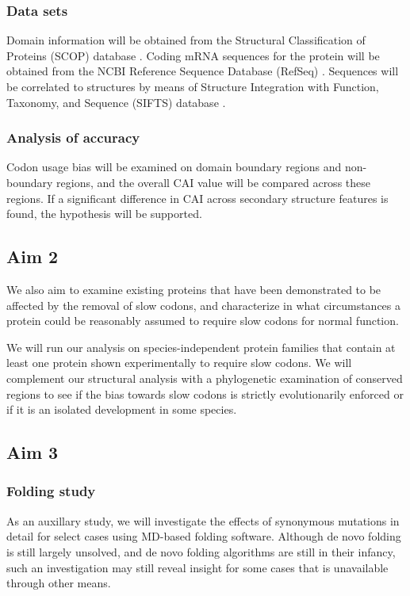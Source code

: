 \documentclass[11pt]{nih}
\begin{document}
\subsubsection{Data sets}
Domain information will be obtained from the Structural Classification of Proteins (SCOP) database \citep{scop}. Coding mRNA sequences for the protein will be obtained from the NCBI Reference Sequence Database (RefSeq) \citep{refseq}. Sequences will be correlated to structures by means of Structure Integration with Function, Taxonomy, and Sequence (SIFTS) database \citep{sifts}.

\subsubsection{Analysis of accuracy}
Codon usage bias will be examined on domain boundary regions and non-boundary regions, and the overall CAI value will be compared across these regions. If a significant difference in CAI across secondary structure features is found, the hypothesis will be supported.
\cite{Liu:2011p8245}


\subsection{Aim 2}
We also aim to examine existing proteins that have been demonstrated to be affected by the removal of slow codons, and characterize in what circumstances a protein could be reasonably assumed to require slow codons for normal function.

We will run our analysis on species-independent protein families that contain at least one protein shown experimentally to require slow codons. We will complement our structural analysis with a phylogenetic examination of conserved regions to see if the bias towards slow codons is strictly evolutionarily enforced or if it is an isolated development in some species.
\subsection{Aim 3}

\subsubsection{Folding study}
As an auxillary study, we will investigate the effects of synonymous mutations in detail for select cases using MD-based folding software. Although de novo folding is still largely unsolved, and de novo folding algorithms are still in their infancy, such an investigation may still reveal insight for some cases that is unavailable through other means. \cite{Zhang:2008p3335}  




 

\appendix
\end{document}
